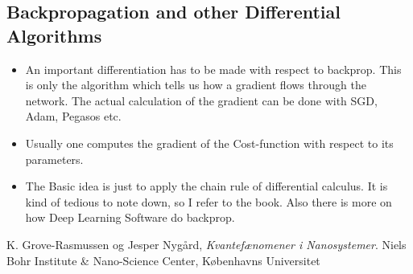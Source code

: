 \documentclass[a4paper]{article}
\begin{document}
\subsection{Backpropagation and other Differential Algorithms}
\begin{itemize}
\item An important differentiation has to be made with respect to backprop. This is only the algorithm which tells us how a gradient flows through the network. The actual calculation of the gradient can be done with SGD, Adam, Pegasos etc. 
\item Usually one computes the gradient of the Cost-function with respect to its parameters. 
\item The Basic idea is just to apply the chain rule of differential calculus. It is kind of tedious to note down, so I refer to the book. Also there is more on how Deep Learning Software do backprop.
\end{itemize}


\begin{thebibliography}{9}
  K. Grove-Rasmussen og Jesper Nygård,
  \emph{Kvantefænomener i Nanosystemer}.
  Niels Bohr Institute \& Nano-Science Center, Københavns Universitet

\end{thebibliography}
\end{document}
